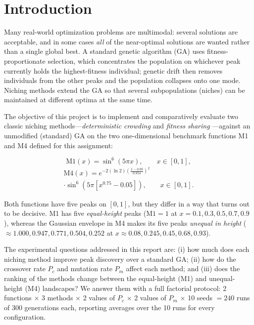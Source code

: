 \documentclass[conference]{IEEEtran}
\begin{document}
\section{Introduction}
\label{sec:intro}

Many real-world optimization problems are multimodal: several solutions are
acceptable, and in some cases \emph{all} of the near-optimal solutions are
wanted rather than a single global best. A standard genetic algorithm (GA)
\cite{b1} uses fitness-proportionate selection, which concentrates the
population on whichever peak currently holds the highest-fitness individual;
genetic drift then removes individuals from the other peaks and the population
collapses onto one mode. Niching methods \cite{b2,b3} extend the GA so that
several subpopulations (niches) can be maintained at different optima at the
same time.

The objective of this project is to implement and comparatively evaluate two
classic niching methods---\emph{deterministic crowding} \cite{b2} and
\emph{fitness sharing} \cite{b3}---against an unmodified (standard) GA on the
two one-dimensional benchmark functions M1 and M4 defined for this assignment:

\begin{equation}
\mathrm{M1}(x) = \sin^{6}(5\pi x), \qquad x \in [0,1],
\label{eq:m1}
\end{equation}
\begin{multline}
\mathrm{M4}(x) = e^{-2(\ln 2)\left(\frac{x-0.08}{0.854}\right)^{2}}\\
\cdot \sin^{6}\!\left(5\pi\left[x^{0.75}-0.05\right]\right), \qquad x \in [0,1].
\label{eq:m4}
\end{multline}

Both functions have five peaks on $[0,1]$, but they differ in a way that turns
out to be decisive. M1 has five \emph{equal-height} peaks
($\mathrm{M1}=1$ at $x = 0.1, 0.3, 0.5, 0.7, 0.9$), whereas the Gaussian
envelope in M4 makes its five peaks \emph{unequal in height}
($\approx 1.000, 0.947, 0.771, 0.504, 0.252$ at
$x \approx 0.08, 0.245, 0.45, 0.68, 0.93$).

The experimental questions addressed in this report are: (i) how much does
each niching method improve peak discovery over a standard GA; (ii) how do the
crossover rate $P_c$ and mutation rate $P_m$ affect each method; and (iii)
does the ranking of the methods change between the equal-height (M1) and
unequal-height (M4) landscapes? We answer them with a full factorial protocol:
2 functions $\times$ 3 methods $\times$ 2 values of $P_c$ $\times$ 2 values of
$P_m$ $\times$ 10 seeds $= 240$ runs of 300 generations each, reporting
averages over the 10 runs for every configuration.
\end{document}
